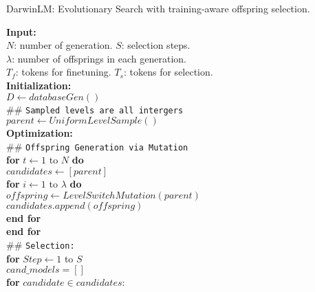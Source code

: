 \begin{algorithm}[t]
\caption{DarwinLM: Evolutionary Search with training-aware offspring selection.}
\label{alg:darwinlm}
\textbf{Input:}\\
$N$: number of generation. $S$: selection steps.\\
$\lambda$: number of offsprings in each generation. \\
$T_f$: tokens for finetuning. $T_s$: tokens for selection. \\
\textbf{Initialization:}\\
 \hspace*{1em}$D \gets databaseGen()$ \\
 \hspace*{1em} \#\# \texttt{Sampled levels are all intergers} \\
 \hspace*{1em}$ parent \gets \mathit{UniformLevelSample()}$ \\
\textbf{Optimization:}\\
\hspace*{1em} \#\# \texttt{Offspring Generation via Mutation} \\
 \hspace*{1em}\textbf{for} $t \gets 1$ to $N$ \textbf{do}\\
 \hspace*{2em} $ candidates \gets [parent]$ \\
  \hspace*{2em}\textbf{for} $i \gets 1$ to $\lambda$ \textbf{do}\\
   \hspace*{3em} $\mathit{offspring} \gets \mathit{LevelSwitchMutation}(parent)$ \\
   \hspace*{3em} $candidates.append(\mathit{offspring})$ \\
 \hspace*{2em} \textbf{end for}\\
  \hspace*{1em}\textbf{end for}\\
 \hspace*{1em} \#\# \texttt{Selection:} \\
 \hspace*{1em} \textbf{for} $Step \gets 1$ to $S$\\
 \hspace*{2em} $cand\_models = []$\\
 \hspace*{2em} \textbf{for} $candidate \in candidates:$ \\

\end{algorithm}
